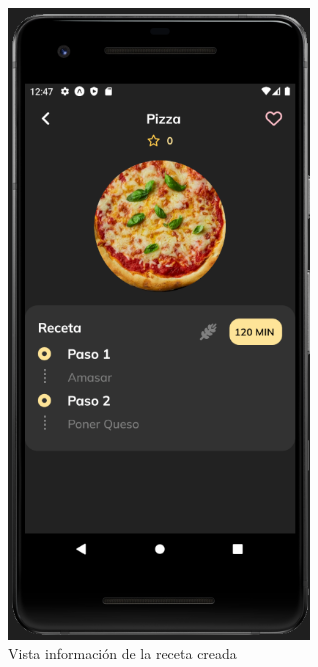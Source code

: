 \begin{figure}[!h]
  \centering
  \includegraphics[width=8cm, scale=1]{Images/Imagenes/add8.png}
  \caption{Vista información de la receta creada}
  \label{fig:add8}
\end{figure}

